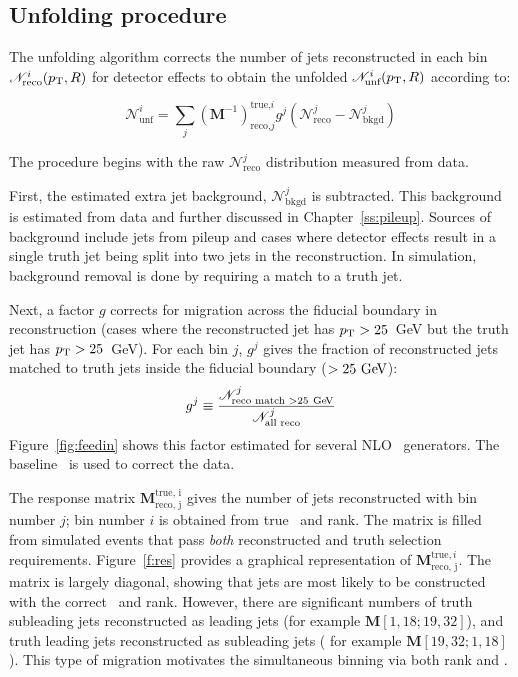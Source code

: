 \subsection{Unfolding procedure}
\label{ss:unfproc}
The unfolding algorithm corrects the number of jets reconstructed in each bin ${\mathscr N}^i_{\textrm {reco} }(p_{\text{T}},R)$ for detector effects to obtain the unfolded ${\mathscr N}^i_{\textrm{unf} }(p_{\text{T}},R)$ according to:

\begin{equation}
{\mathscr N}^i_{\textrm {unf}}= \sum_j \left ({\mathbf M}^{-1} \right )_{\textrm{reco,} j}^{\textrm{true,} i} g^j \left ({\mathscr N}^j_{\textrm {reco}}-{\mathscr N}^j_{\textrm{bkgd}}\right )
\label{eqn:unf}
\end{equation}

\noindent
The procedure begins with the raw ${\mathscr N}^j_{\textrm {reco}}$ distribution measured from data. 

First, the estimated extra jet background, ${\mathscr N}^j_{\textrm{bkgd}}$ is subtracted. This background is estimated from data and further discussed in Chapter~\ref{ss:pileup}. Sources of background  include jets from pileup and cases where
detector effects result in a single truth jet being split into 
two jets in the reconstruction. In simulation, background removal is done by requiring a match to a truth jet. 

Next, a factor $g$ corrects for migration across the fiducial boundary in reconstruction (cases where the reconstructed jet has
$p_{\text{T}}>25$~GeV but the truth jet has $p_{\text{T}}>25$~GeV). For each bin $j$, $g^j$ gives the fraction of reconstructed jets matched to truth jets inside the fiducial boundary ($>25 \gev$):
\begin{displaymath}
g^j \equiv \frac{{\mathscr N}^j_{\textrm {reco match }> 25 \gev}} {{\mathscr N}^j_{\textrm {all reco}}}
\label{eqn:feedin}
\end{displaymath}
Figure~\ref{fig:feedin} shows this factor estimated for several NLO \ttbar\ generators. The baseline \powpy\ is used to correct the data.

The response matrix ${\mathbf M}_{\textrm{reco, j}}^{\textrm{true, i}}$ gives the number of jets reconstructed with bin number $j$; bin number $i$ is obtained from true \pt\ and rank.
The matrix is 
filled from simulated events that pass \textit{ both} reconstructed and truth selection requirements.
Figure~\ref{f:res} provides a graphical representation of ${\mathbf M}_{\textrm{reco, j}}^{\textrm{true}, i}$. 
The matrix is largely diagonal, showing that jets are most likely to be constructed with the correct \pt\ and rank.
However, there are significant numbers of truth subleading jets reconstructed as leading jets (for example ${\mathbf M}[1,18; 19,32]$), and 
truth leading jets reconstructed as subleading jets ( for example ${\mathbf M}[19,32;1,18]$). This type of migration motivates the simultaneous binning via both rank and \pt.



